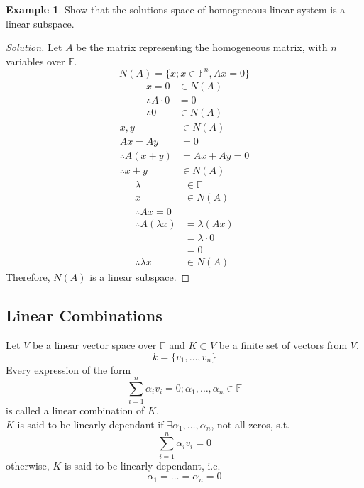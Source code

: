 \documentclass[fleqn, a4paper, 12pt]{article}
\theoremstyle{definition}
\newtheorem{example}{Example}
\theoremstyle{theorem}
\newenvironment{solution}
{\begin{proof}[Solution]\let\qed\relax}
	{\end{proof}}
\begin{document}
	\begin{example}
		Show that the solutions space of homogeneous linear system is a linear subspace.
	\end{example}

	\begin{solution}
		Let $A$ be the matrix representing the homogeneous matrix, with $n$ variables over $\mathbb{F}$. 
		\begin{equation*}
			N(A) = \{x ; x \in \mathbb{F}^n, Ax = 0\}
		\end{equation*}
		\begin{align*}
			x = 0 &\in N(A) \\
			\therefore A \cdot 0 &= 0	\\
			\therefore 0 &\in N(A)
		\end{align*}
		\begin{align*}
			x, y &\in N(A) \\
			A x = A y &= 0 \\
			\therefore A(x + y) &= A x + A y = 0 \\
			\therefore x + y &\in N(A)
		\end{align*}
			\begin{align*}
			\lambda &\in \mathbb{F} \\
			x &\in N(A) \\
			\therefore A x = 0\\
			\therefore A(\lambda x) &= \lambda (A x) \\
			&= \lambda \cdot 0 \\
			&= 0 \\
			\therefore \lambda x &\in N(A)
			\end{align*}
			Therefore, $N(A)$ is a linear subspace.
	\end{solution}

\subsection{Linear Combinations}

Let $V$ be a linear vector space over $\mathbb{F}$ and $K \subset V$ be a finite set of vectors from $V$.
\begin{equation*}
	k = \{v_1, \dots, v_n\}
\end{equation*}
Every expression of the form 
\begin{equation*}
	\sum_{i=1}^{n} \alpha_i v_i = 0 ; \alpha_1, \dots, \alpha_n \in \mathbb{F}
\end{equation*}
is called a linear combination of $K$.\\
$K$ is said to be linearly dependant if $\exists \alpha_1, \dots, \alpha_n$, not all zeros, s.t. 
\begin{equation*}
	\sum_{i=1}^{n} \alpha_i v_i = 0
\end{equation*}
otherwise, $K$ is said to be linearly dependant, i.e.
\begin{equation*}
	\alpha_1 = \dots = \alpha_n = 0
\end{equation*}
\end{document}
